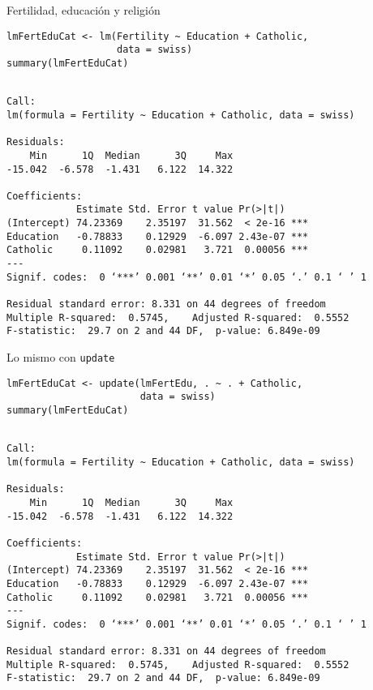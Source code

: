 \documentclass[xcolor={usenames,svgnames,dvipsnames}]{beamer}
\begin{document}
\begin{frame}[fragile,label={sec:org856ff27}]{Fertilidad, educación y religión}
 \lstset{language=r,label= ,caption= ,captionpos=b,numbers=none}
\begin{lstlisting}
lmFertEduCat <- lm(Fertility ~ Education + Catholic,
                   data = swiss)
summary(lmFertEduCat)
\end{lstlisting}

\begin{verbatim}

Call:
lm(formula = Fertility ~ Education + Catholic, data = swiss)

Residuals:
    Min      1Q  Median      3Q     Max 
-15.042  -6.578  -1.431   6.122  14.322 

Coefficients:
            Estimate Std. Error t value Pr(>|t|)    
(Intercept) 74.23369    2.35197  31.562  < 2e-16 ***
Education   -0.78833    0.12929  -6.097 2.43e-07 ***
Catholic     0.11092    0.02981   3.721  0.00056 ***
---
Signif. codes:  0 ‘***’ 0.001 ‘**’ 0.01 ‘*’ 0.05 ‘.’ 0.1 ‘ ’ 1

Residual standard error: 8.331 on 44 degrees of freedom
Multiple R-squared:  0.5745,	Adjusted R-squared:  0.5552 
F-statistic:  29.7 on 2 and 44 DF,  p-value: 6.849e-09
\end{verbatim}
\end{frame}

\begin{frame}[fragile,label={sec:org29c8412}]{Lo mismo con \texttt{update}}
 \lstset{language=r,label= ,caption= ,captionpos=b,numbers=none}
\begin{lstlisting}
lmFertEduCat <- update(lmFertEdu, . ~ . + Catholic,
                       data = swiss)
summary(lmFertEduCat)
\end{lstlisting}

\begin{verbatim}

Call:
lm(formula = Fertility ~ Education + Catholic, data = swiss)

Residuals:
    Min      1Q  Median      3Q     Max 
-15.042  -6.578  -1.431   6.122  14.322 

Coefficients:
            Estimate Std. Error t value Pr(>|t|)    
(Intercept) 74.23369    2.35197  31.562  < 2e-16 ***
Education   -0.78833    0.12929  -6.097 2.43e-07 ***
Catholic     0.11092    0.02981   3.721  0.00056 ***
---
Signif. codes:  0 ‘***’ 0.001 ‘**’ 0.01 ‘*’ 0.05 ‘.’ 0.1 ‘ ’ 1

Residual standard error: 8.331 on 44 degrees of freedom
Multiple R-squared:  0.5745,	Adjusted R-squared:  0.5552 
F-statistic:  29.7 on 2 and 44 DF,  p-value: 6.849e-09
\end{verbatim}
\end{frame}
\end{document}
